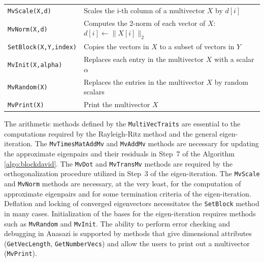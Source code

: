 \documentclass[acmtoms,acmnow]{acmtrans2m}
\newcommand{\aspace}[1]{\texttt{#1}}
\begin{document}
\begin{table}
\begin{center}
\begin{tabular}{| p{4cm} | p{8cm} |}
{\tt MvScale(X,d)}    & Scales the i-th column of a multivector $X$ by $d[i]$ \\

{\tt MvNorm(X,d)}     & Computes the 2-norm of each vector of
$X$: $d[i] \leftarrow \|X[i]\|_2$  \\\hline

{\tt SetBlock(X,Y,index)} & Copies the vectors in $X$ to a subset of vectors in
$Y$ \\

{\tt MvInit(X,alpha)} & Replaces each entry in the multivector $X$ with a scalar $\alpha$  \\

{\tt MvRandom(X)} & Replaces the entries in the multivector $X$ by random
scalars \\\hline

{\tt MvPrint(X)} & Print the multivector $X$ \\

\hline
\end{tabular}
\end{center}
\end{table}


The arithmetic methods defined by the \aspace{MultiVecTraits} are essential to the
computations required by the Rayleigh-Ritz method and the general eigen-iteration.  The
\aspace{MvTimesMatAddMv} and \aspace{MvAddMv} methods are necessary for updating the
approximate eigenpairs and their residuals in Step~7 of the Algorithm
\ref{algo:blockdavid}.  The \aspace{MvDot} and \aspace{MvTransMv} methods are required by
the orthogonalization procedure utilized in Step~3 of the eigen-iteration.  The
\aspace{MvScale} and \aspace{MvNorm} methods are necessary, at the very least, for the
computation of approximate eigenpairs and for some termination criteria of the
eigen-iteration.  Deflation and locking of converged eigenvectors necessitates the
\aspace{SetBlock} method in many cases.  Initialization of the bases for the
eigen-iteration requires methods such as \aspace{MvRandom} and \aspace{MvInit}.  The
ability to perform error checking and debugging in Anasazi is supported by methods that
give dimensional attributes (\aspace{GetVecLength}, \aspace{GetNumberVecs}) and allow the
users to print out a multivector (\aspace{MvPrint}). 
\end{document}
